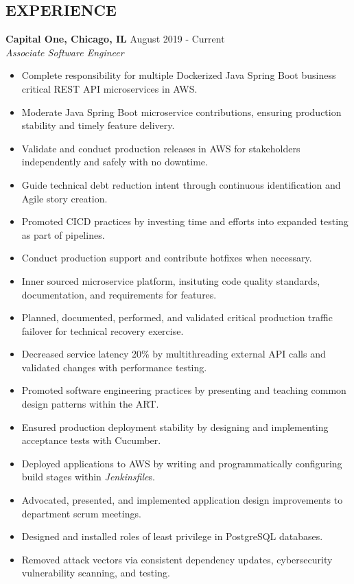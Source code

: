 \documentclass[overlapped]{res}
\begin{document}
\begin{resume}
\section{EXPERIENCE}
\textbf{Capital One, Chicago, IL} \hfill August 2019 - Current \\
{\sl Associate Software Engineer}
\begin{itemize}  \itemsep -2pt %
    \item Complete responsibility for multiple Dockerized Java Spring Boot business critical REST API microservices in AWS.
    \item Moderate Java Spring Boot microservice contributions, ensuring production stability and timely feature delivery. %
    \item Validate and conduct production releases in AWS for stakeholders independently and safely with no downtime.
    \item Guide technical debt reduction intent through continuous identification and Agile story creation.
    \item Promoted CICD practices by investing time and efforts into expanded testing as part of pipelines.
    \item Conduct production support and contribute hotfixes when necessary.
    \item Inner sourced microservice platform, insituting code quality standards, documentation, and requirements for features.
    \item Planned, documented, performed, and validated critical production traffic failover for technical recovery exercise. 
    \item Decreased service latency 20\% by multithreading external
    API calls and validated changes with performance testing.
    \item Promoted software engineering practices by presenting and teaching common design patterns within the ART. 
    \item Ensured production deployment stability by designing 
    and implementing acceptance tests with Cucumber.
    \item Deployed applications to AWS by
    writing and programmatically configuring build stages within {\it Jenkinsfile}s.
    \item Advocated, presented, and implemented application design improvements to department scrum meetings.
    \item Designed and installed roles of least privilege in PostgreSQL databases.
    \item Removed attack vectors via consistent dependency updates, cybersecurity vulnerability scanning, and testing.
\end{itemize}


\end{resume}
\end{document}
